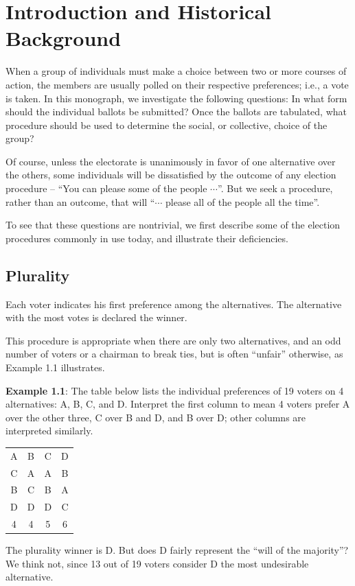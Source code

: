 \documentclass{article}
\begin{document}
\newpage

\section{Introduction and Historical Background}


When a group of individuals must make a choice between two or more courses of action, the members are usually polled on their respective preferences; i.e., a vote is taken. In this monograph, we investigate the following questions: In what form should the individual ballots be submitted? Once the ballots are tabulated, what procedure should be used to determine the social, or collective, choice of the group? 

Of course, unless the electorate is unanimously in favor of one alternative over the others, some individuals will be dissatisfied by the outcome of any election procedure -- ``You can please some of the people $\cdots$''. But we seek a procedure, rather than an outcome, that will ``$\cdots$ please all of the people all the time''.

To see that these questions are nontrivial, we first describe some of the election procedures commonly in use today, and illustrate their deficiencies.


\subsection*{Plurality}

Each voter indicates his first preference among the alternatives. The alternative with the most votes is declared the winner.

This procedure is appropriate when there are only two alternatives, and an odd number of voters or a chairman to break ties, but is often ``unfair'' otherwise, as Example 1.1 illustrates.

\textbf{Example 1.1}: The table below lists the individual preferences of 19 voters on 4 alternatives: A, B, C, and D. Interpret the first column to mean 4 voters prefer A over the other three, C over B and D, and B over D; other columns are interpreted similarly.
\begin{center}
\begin{tabular}{c|c|c|c}
  A & B & C & D \\
  C & A & A & B \\
  B & C & B & A \\
  D & D & D & C \\
  \hline
  4 & 4 & 5 & 6 \\
\end{tabular}
\end{center}
The plurality winner is D. But does D fairly represent the ``will of the majority''? We think not, since 13 out of 19 voters consider D the most undesirable alternative.
\end{document}
